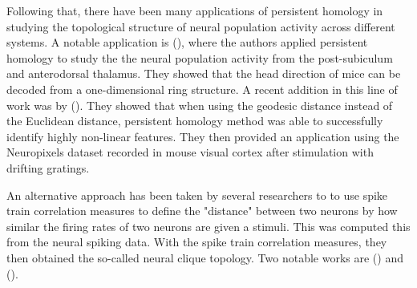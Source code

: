 Following that, there have been many applications of persistent homology in studying the topological structure of neural population activity across different systems. A notable application is (\cite{chaudhuri_intrinsic_2019}), where the authors applied persistent homology to study the the neural population activity from the post-subiculum and anterodorsal thalamus. They showed that the head direction of mice can be decoded from a one-dimensional ring structure. A recent addition in this line of work was by (\cite{beshkov_geodesic-based_2021}). They showed that when using the geodesic distance instead of the Euclidean distance, persistent homology method was able to successfully identify highly non-linear features. They then provided an application using the Neuropixels dataset recorded in mouse visual cortex after stimulation with drifting gratings.

An alternative approach has been taken by several researchers to to use spike train correlation measures to define the "distance" between two neurons by how similar the firing rates of two neurons are given a stimuli. This was computed this from the neural spiking data. With the spike train correlation measures, they then obtained the so-called neural clique topology. Two notable works are  (\cite{giusti_clique_2015}) and (\cite{bardin_topological_2019}). 
